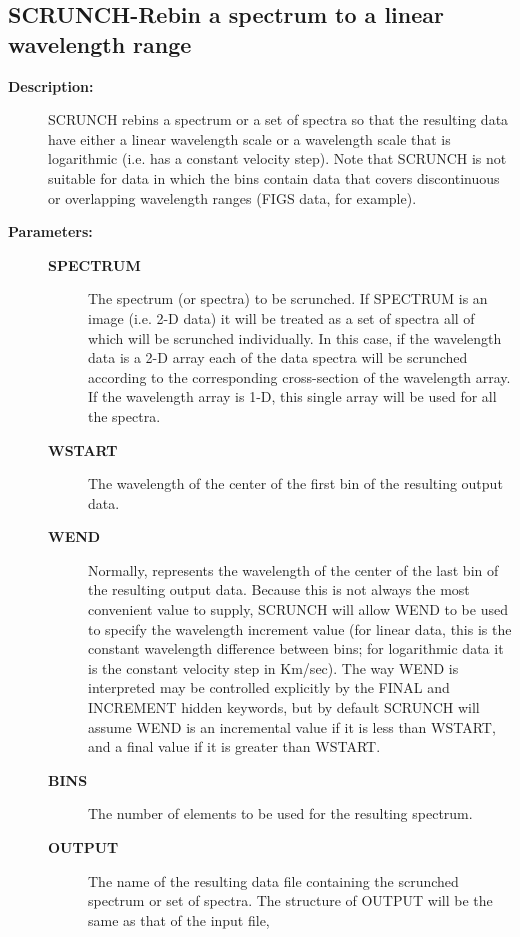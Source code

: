 \subsection{SCRUNCH-\label{SCRUNCH}Rebin a spectrum to a linear wavelength range}
\begin{description}

\item [{\bf Description:}]
 SCRUNCH rebins a spectrum or a set of spectra so that the resulting
 data have either a linear wavelength scale or a wavelength scale
 that is logarithmic (i.e. has a constant velocity step).  Note that
 SCRUNCH is not suitable for data in which the bins contain data that
 covers discontinuous or overlapping wavelength ranges (FIGS data,
 for example).

\item [{\bf Parameters:}]
\begin{description}
\item [{\bf SPECTRUM}]
 The spectrum (or spectra) to be scrunched.
 If SPECTRUM is an image (i.e. 2-D data) it will be treated
 as a set of spectra all of which will be scrunched
 individually.  In this case, if the wavelength data is
 a 2-D array each of the data spectra will be scrunched
 according to the corresponding cross-section of the
 wavelength array.  If the wavelength array is 1-D, this
 single array will be used for all the spectra.
\item [{\bf WSTART}]
 The wavelength of the center of the first bin
 of the resulting output data.
\item [{\bf WEND}]
 Normally, represents the wavelength of the center of
 the last bin of the resulting output data.  Because this
 is not always the most convenient value to supply, SCRUNCH
 will allow WEND to be used to specify the wavelength
 increment value (for linear data, this is the constant
 wavelength difference between bins; for logarithmic data
 it is the constant velocity step in Km/sec).  The way
 WEND is interpreted may be controlled explicitly by the
 FINAL and INCREMENT hidden keywords, but by default SCRUNCH
 will assume WEND is an incremental value if it is less than
 WSTART, and a final value if it is greater than WSTART.
\item [{\bf BINS}]
 The number of elements to be used for the resulting spectrum.
\item [{\bf OUTPUT}]
 The name of the resulting data file containing
 the scrunched spectrum or set of spectra.  The structure
 of OUTPUT will be the same as that of the input file,

\end{description}
\end{description}
